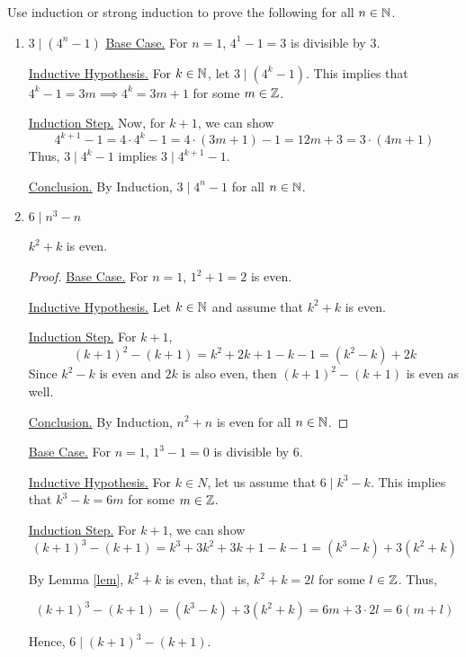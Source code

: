 \bp Use induction or strong induction to prove the following for all $n \in \mathbb{N}$.
\begin{enumerate}
	\item $3 \mid (4^n - 1)$
		\bs
		\underline{Base Case.} For $n = 1$, $4^1 - 1 = 3$ is divisible by $3$.
		
		\underline{Inductive Hypothesis.} 
		For $k \in \mathbb{N}$, let $3 \mid (4^k-1)$.
		This implies that $4^k - 1 = 3m \implies 4^k = 3m+1$ for some $m \in \mathbb{Z}$.

		\underline{Induction Step.} 
		Now, for $k+1$, we can show
		$$4^{k+1}-1 = 4 \cdot 4^k - 1 = 4 \cdot (3m+1) - 1 = 12m + 3 = 3 \cdot (4m+1)$$
		Thus, $3 \mid 4^k-1$ implies $3 \mid 4^{k+1}-1$.
		
		\underline{Conclusion.} 
		By Induction, $3 \mid 4^n-1$ for all $n \in \mathbb{N}$.
		\es
	
	\item $6 \mid n^3 - n$
		\bs
		\begin{lemma}\label{lem} $k^2 + k$ is even.\end{lemma}
		\begin{proof}
			\underline{Base Case.} For $n = 1$, $1^2 + 1 = 2$ is even.
			
			\underline{Inductive Hypothesis.} Let $k \in \mathbb{N}$ and assume that $k^2 + k$ is even.

			\underline{Induction Step.} For $k+1$,
			$$(k+1)^2 - (k+1) = k^2 + 2k + 1 - k - 1 = (k^2 - k) + 2k$$
			Since $k^2 - k$ is even and $2k$ is also even, then $(k+1)^2 - (k+1)$ is even as well.

			\underline{Conclusion.} By Induction, $n^2 + n$ is even for all $n \in \mathbb{N}$.
		\end{proof}

		\underline{Base Case.} For $n = 1$, $1^3 - 1 = 0$ is divisible by $6$.

		\underline{Inductive Hypothesis.}
		For $k \in N$, let us assume that $6 \mid k^3 - k$. This implies that $k^3 - k = 6m$ for some $m \in \mathbb{Z}$.

		\underline{Induction Step.}
		For $k+1$, we can show
		$$(k+1)^3 - (k+1) = k^3 + 3k^2 + 3k + 1 - k - 1
		= (k^3 - k) + 3(k^2 + k)$$

		By Lemma \ref{lem}, $k^2 + k$ is even, that is, $k^2 + k = 2l$ for some $l \in \mathbb{Z}$. Thus, 

		$$(k+1)^3 - (k+1) = (k^3 - k) + 3(k^2 + k) = 6m + 3 \cdot 2l = 6(m+l)$$

		Hence, $6 \mid (k+1)^3 - (k+1)$.


\end{enumerate}

